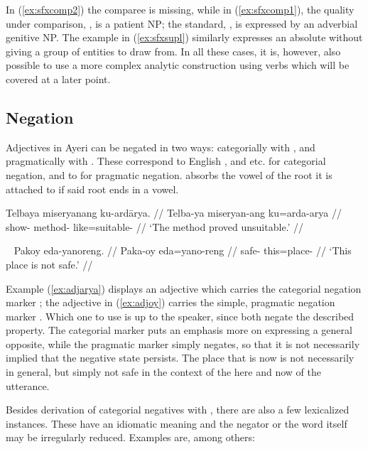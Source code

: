 In (\ref{ex:sfxcomp2}) the comparee is missing, while in (\ref{ex:sfxcomp1}), 
the quality under comparison, , is a patient NP; the standard, , is 
expressed by an adverbial genitive NP. The example in (\ref{ex:sfxsupl}) 
similarly expresses an absolute without giving a group of entities to draw from. 
In all these cases, it is, however, also possible to use a more complex 
analytic construction using verbs which will be covered at a later point.


\subsection{Negation}

Adjectives in Ayeri can be negated in two ways: categorially with 
, and pragmatically with . These correspond to 
English , and  etc. for categorial negation, and to 
 for pragmatic negation.  absorbs the vowel of the root 
it is attached to if said root ends in a vowel.

\ex\label{ex:adjarya}\begingl
	\gla Telbaya miseryanang ku-ardārya. //
	\glb Telba-ya miseryan-ang ku=arda-arya //
	\glc show-\TsgM{} method-\Aarg{} like=suitable-\Neg{} //
	\glft `The method proved unsuitable.' //
\endgl\xe

\ex~\label{ex:adjoy}\begingl
	\gla Pakoy eda-yanoreng. //
	\glb Paka-oy eda=yano-reng //
	\glc safe-\Neg{} this=place-\AargI{} //
	\glft `This place is not safe.' //
\endgl\xe

Example (\ref{ex:adjarya}) displays an adjective which carries the categorial 
negation marker ; the adjective in (\ref{ex:adjoy}) carries 
the simple, pragmatic negation marker . Which one to use is up 
to the speaker, since both negate the described property. The categorial marker 
puts an emphasis more on expressing a general opposite, while the pragmatic 
marker simply negates, so that it is not necessarily implied that the negative 
state persists. The place that is  now is not 
necessarily  in general, but simply not safe in 
the context of the here and now of the utterance.

Besides  derivation of categorial negatives with , 
there are also a few lexicalized instances. These have an idiomatic meaning and 
the negator or the word itself may be irregularly reduced. Examples are, among 
others:

